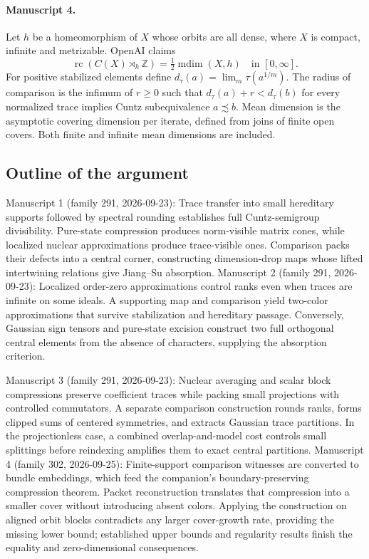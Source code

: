 \documentclass[11pt]{article}
\begin{document}
\paragraph{Manuscript 4.}
Let $h$ be a homeomorphism of $X$ whose orbits are all dense, where $X$ is compact, infinite and metrizable. OpenAI claims
\[
\operatorname{rc}(C(X)\rtimes_h\mathbb Z)=\tfrac12\operatorname{mdim}(X,h)\quad\text{in }[0,\infty].
\]
For positive stabilized elements define $d_\tau(a)=\lim_m\tau(a^{1/m})$. The radius of comparison is the infimum of $r\ge0$ such that $d_\tau(a)+r<d_\tau(b)$ for every normalized trace implies Cuntz subequivalence $a\precsim b$. Mean dimension is the asymptotic covering dimension per iterate, defined from joins of finite open covers. Both finite and infinite mean dimensions are included.

\subsection{Outline of the argument}
Manuscript 1 (family 291, 2026-09-23): Trace transfer into small hereditary supports followed by spectral rounding establishes full Cuntz-semigroup divisibility. Pure-state compression produces norm-visible matrix cones, while localized nuclear approximations produce trace-visible ones. Comparison packs their defects into a central corner, constructing dimension-drop maps whose lifted intertwining relations give Jiang--Su absorption. Manuscript 2 (family 291, 2026-09-23): Localized order-zero approximations control ranks even when traces are infinite on some ideals. A supporting map and comparison yield two-color approximations that survive stabilization and hereditary passage. Conversely, Gaussian sign tensors and pure-state excision construct two full orthogonal central elements from the absence of characters, supplying the absorption criterion.

Manuscript 3 (family 291, 2026-09-23): Nuclear averaging and scalar block compressions preserve coefficient traces while packing small projections with controlled commutators. A separate comparison construction rounds ranks, forms clipped sums of centered symmetries, and extracts Gaussian trace partitions. In the projectionless case, a combined overlap-and-model cost controls small splittings before reindexing amplifies them to exact central partitions. Manuscript 4 (family 302, 2026-09-25): Finite-support comparison witnesses are converted to bundle embeddings, which feed the companion's boundary-preserving compression theorem. Packet reconstruction translates that compression into a smaller cover without introducing absent colors. Applying the construction on aligned orbit blocks contradicts any larger cover-growth rate, providing the missing lower bound; established upper bounds and regularity results finish the equality and zero-dimensional consequences.
\end{document}

